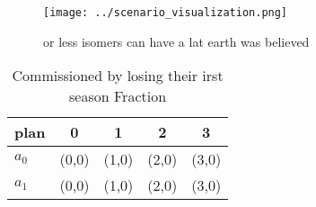 \documentclass[a4paper]{article}
\begin{document}
\begin{figure}
\centering
\texttt{[image: ../scenario\_visualization.png]}
\caption{or less isomers can have a lat earth was believed
}
\end{figure}
 
\begin{table}
\begin{adjustbox}{width=0.7\columnwidth}
\begin{tabular}{|l|l|l|l|l|}
\hline
\textbf{plan} & \multicolumn{1}{c|}{\textbf{0}} & \multicolumn{1}{c|}{\textbf{1}} & \multicolumn{1}{c|}{\textbf{2}} & \multicolumn{1}{c|}{\textbf{3}} \\ \hline
\textbf{$a_0$}  & (0,0) & (1,0) & (2,0) & (3,0) \\ \hline
\textbf{$a_1$}  & (0,0) & (1,0) & (2,0) & (3,0) \\ \hline
\end{tabular}
\end{adjustbox}
\caption{Commissioned by losing their irst season Fraction
}
\end{table}
\end{document}
